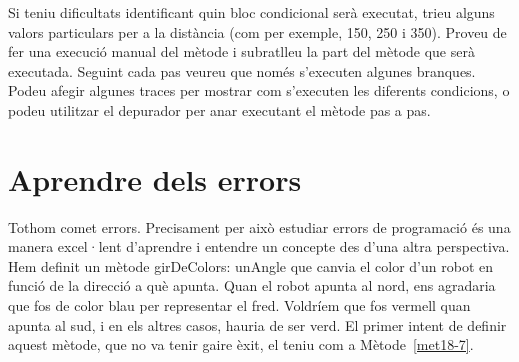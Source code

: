 Si teniu dificultats identificant quin bloc condicional serà executat, trieu alguns valors particulars per a la distància (com per exemple, 150, 250 i 350). Proveu de fer una execució manual del mètode i subratlleu la part del mètode que serà executada. Seguint cada pas veureu que només s'executen algunes branques. Podeu afegir algunes traces per mostrar com s'executen les diferents condicions, o podeu utilitzar el depurador per anar executant el mètode pas a pas.  

\section{Aprendre dels errors}
Tothom comet errors. Precisament per això estudiar errors de programació és una manera excel·lent d'aprendre i entendre un concepte des d'una altra perspectiva. Hem definit un mètode \textsf{girDeColors: unAngle} que canvia el color d'un robot  en funció de la direcció a què apunta. Quan el robot apunta al nord, ens agradaria que fos de color blau per representar el fred. Voldríem que fos vermell quan apunta al sud, i en els altres casos, hauria de ser verd. El primer intent de definir aquest mètode, que no va tenir gaire èxit, el teniu com a Mètode~\ref{met18-7}.


